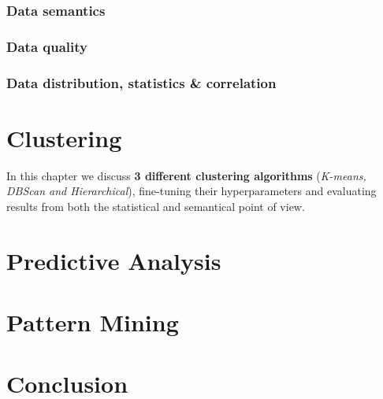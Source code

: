 \documentclass[10pt,a4paper]{report}
\begin{document}
\subsection{Data semantics}
\subsection{Data quality}
\subsection{Data distribution, statistics \& correlation}



\chapter{Clustering}
In this chapter we discuss \textbf{3 different clustering algorithms} (\textit{K-means, DBScan and Hierarchical}), fine-tuning their hyperparameters and evaluating results from both the statistical and semantical point of view.

\chapter{Predictive Analysis}


\chapter{Pattern Mining}



\chapter{Conclusion}
\end{document}
